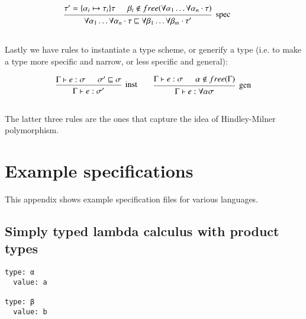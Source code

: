 \begin{appendices}
\[\begin{array}{c@{\qquad}c}  
    \mbox{\begin{prooftree}
      \hypo{\tau' = \{\alpha_i \mapsto \tau_i\}\tau}
      \hypo{\beta_i \notin free(\forall \alpha_1 \ldots \forall
        \alpha_n \cdot \tau)}
      \infer2[spec]{\forall \alpha_1 \ldots \forall \alpha_n \cdot
        \tau \sqsubseteq \forall \beta_1 \ldots \forall
        \beta_m \cdot \tau' }
    \end{prooftree}}
    \\\\
\end{array} \]  
  
Lastly we have rules to instantiate a type scheme, or generify a
type (i.e. to make a type more specific and narrow, or less specific
and general):

\[\begin{array}{c@{\qquad}c}  
    \mbox{\begin{prooftree}
      \hypo{\Gamma \vdash e : \sigma}
      \hypo{\sigma' \sqsubseteq \sigma}
      \infer2[inst]{\Gamma \vdash e : \sigma'}
    \end{prooftree}}
    &
    \mbox{\begin{prooftree}
      \hypo{\Gamma \vdash e : \sigma}
      \hypo{\alpha \notin free(\Gamma)}
      \infer2[gen]{\Gamma \vdash e : \forall \alpha \sigma}
    \end{prooftree}}
    \\\\
\end{array} \]

The latter three rules are the ones that capture the idea of
Hindley-Milner polymorphism.

\clearpage
\section{Example specifications}
\label{appendix:examplespecifications}

This appendix shows example specification files for various
languages.

\subsection{Simply typed lambda calculus with product types}
\label{STLCspec}

\begin{verbatim}
type: α
  value: a

type: β
  value: b


\end{verbatim}
\end{appendices}

